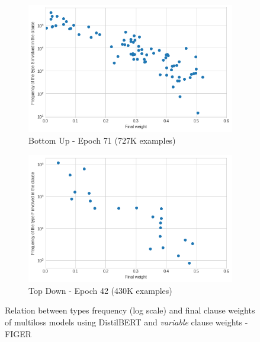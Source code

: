 \begin{figure}[bth]
     \centering
     \begin{subfigure}[b]{0.7\textwidth}
         \centering
         \includegraphics[width=\textwidth]{figures/weight_freq_distilbert_figer_bu_multiloss_variable.png}
         \caption{Bottom Up - Epoch 71 (727K examples)}
         \label{fig:weight_freq_distilbert_figer_bu_multiloss_variable}
         \vspace{10px}
     \end{subfigure}
     \begin{subfigure}[b]{0.7\textwidth}
         \centering
         \includegraphics[width=\textwidth]{figures/weight_freq_distilbert_figer_td_multiloss_variable.png}
         \caption{Top Down - Epoch 42 (430K examples)}
         \label{fig:weight_freq_distilbert_figer_td_multiloss_variable}
     \end{subfigure}
    \caption{Relation between types frequency (log scale) and final clause weights of multiloss models using DistilBERT and \textit{variable} clause weights - FIGER}
    \label{fig:weight_freq_distilbert_figer_variable}
\end{figure}

